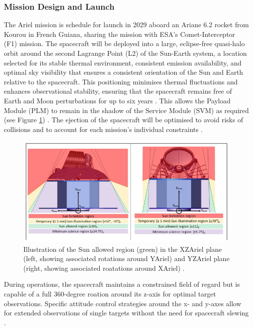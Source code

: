 \documentclass[12pt]{article}
\begin{document}
\subsubsection{Mission Design and Launch}

The Ariel mission is schedule for launch in 2029 aboard an Ariane 6.2 rocket from Kourou in French Guiana, sharing the mission with ESA's Comet-Interceptor (F1) mission. The spacecraft will be deployed into a large, eclipse-free quasi-halo orbit around the second Lagrange Point (L2) of the Sun-Earth system, a location selected for its 
stable thermal environment, consistent emission availability, and optimal sky visibility that ensures a consistent orientation of the Sun and Earth relative to the spacecraft.
This positioning minimises thermal fluctuations and enhances observational stability, ensuring that the spacecraft remains free of Earth and Moon perturbations for up to six years \cite{salvignol2024ariel,arielstudyreport}.
This allows the Payload Module (PLM) to remain in the shadow of the Service Module (SVM) as required (see Figure \ref{fig:6}) \cite{salvignol2024ariel}.
The ejection of the spacecraft will be optimised to avoid risks of collisions and to account for each mission's individual constraints \cite{arielstudyreport}.

\begin{figure}[H]
    \centering
    \includegraphics[width=.9\textwidth]{sun no touch.jpg}
    \caption{Illustration of the Sun allowed region (green) in the XZAriel plane (left, showing associated rotations around YAriel) and YZAriel plane (right, showing associated roatations around XAriel) \protect\cite{salvignol2024ariel}.}
    \label{fig:6}
\end{figure}

During operations, the spacecraft maintains a constrained field of regard but is capable of a full 360-degree roation around its z-axis for optimal target observations. Specific attitude control strategies around the x- and y-axes allow for extended observations of single targets without the need for spacecraft slewing \cite{salvignol2024ariel}.
\end{document}
